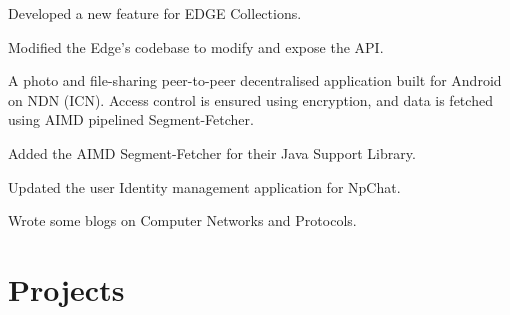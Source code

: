 \documentclass[letterpaper]{deedy-resume} %
\begin{document}
\begin{minipage}[t]{0.66\textwidth}
\sectionspace %


\begin{tightitemize}
\item Developed a new feature for EDGE Collections.
\item Modified the Edge's codebase to modify and expose the API.
\end{tightitemize}

\sectionspace %

A photo and ﬁle-sharing peer-to-peer decentralised application built for Android on NDN (ICN). Access control is ensured using encryption, and data is fetched using AIMD pipelined Segment-Fetcher.
\begin{tightitemize}
\item Added the AIMD Segment-Fetcher for their Java Support Library.
\item Updated the user Identity management application for NpChat.
\end{tightitemize}

\sectionspace %

Wrote some blogs on Computer Networks and Protocols.


\sectionspace %


\section{Projects} 


\end{minipage}
\end{document}
